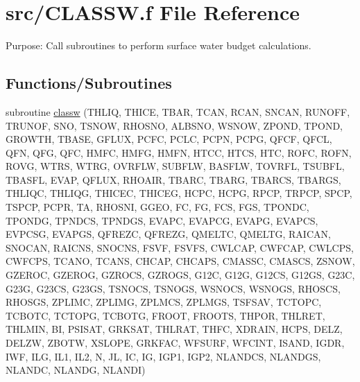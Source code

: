 \hypertarget{CLASSW_8f}{}\section{src/\+C\+L\+A\+S\+S\+W.f File Reference}
\label{CLASSW_8f}


Purpose\+: Call subroutines to perform surface water budget calculations.  


\subsection*{Functions/\+Subroutines}
\begin{DoxyCompactItemize}
\item 
subroutine \hyperlink{CLASSW_8f_aac1827011ed2ca61bd0274e83d1f80ad}{classw} (T\+H\+L\+I\+Q, T\+H\+I\+C\+E, T\+B\+A\+R, T\+C\+A\+N, R\+C\+A\+N, S\+N\+C\+A\+N, R\+U\+N\+O\+F\+F, T\+R\+U\+N\+O\+F, S\+N\+O, T\+S\+N\+O\+W, R\+H\+O\+S\+N\+O, A\+L\+B\+S\+N\+O, W\+S\+N\+O\+W, Z\+P\+O\+N\+D, T\+P\+O\+N\+D, G\+R\+O\+W\+T\+H, T\+B\+A\+S\+E, G\+F\+L\+U\+X, P\+C\+F\+C, P\+C\+L\+C, P\+C\+P\+N, P\+C\+P\+G, Q\+F\+C\+F, Q\+F\+C\+L, Q\+F\+N, Q\+F\+G, Q\+F\+C, H\+M\+F\+C, H\+M\+F\+G, H\+M\+F\+N, H\+T\+C\+C, H\+T\+C\+S, H\+T\+C, R\+O\+F\+C, R\+O\+F\+N, R\+O\+V\+G, W\+T\+R\+S, W\+T\+R\+G, O\+V\+R\+F\+L\+W, S\+U\+B\+F\+L\+W, B\+A\+S\+F\+L\+W, T\+O\+V\+R\+F\+L, T\+S\+U\+B\+F\+L, T\+B\+A\+S\+F\+L, E\+V\+A\+P, Q\+F\+L\+U\+X, R\+H\+O\+A\+I\+R, T\+B\+A\+R\+C, T\+B\+A\+R\+G, T\+B\+A\+R\+C\+S, T\+B\+A\+R\+G\+S, T\+H\+L\+I\+Q\+C, T\+H\+L\+I\+Q\+G, T\+H\+I\+C\+E\+C, T\+H\+I\+C\+E\+G, H\+C\+P\+C, H\+C\+P\+G, R\+P\+C\+P, T\+R\+P\+C\+P, S\+P\+C\+P, T\+S\+P\+C\+P, P\+C\+P\+R, T\+A, R\+H\+O\+S\+N\+I, G\+G\+E\+O, F\+C, F\+G, F\+C\+S, F\+G\+S, T\+P\+O\+N\+D\+C, T\+P\+O\+N\+D\+G, T\+P\+N\+D\+C\+S, T\+P\+N\+D\+G\+S, E\+V\+A\+P\+C, E\+V\+A\+P\+C\+G, E\+V\+A\+P\+G, E\+V\+A\+P\+C\+S, E\+V\+P\+C\+S\+G, E\+V\+A\+P\+G\+S, Q\+F\+R\+E\+Z\+C, Q\+F\+R\+E\+Z\+G, Q\+M\+E\+L\+T\+C, Q\+M\+E\+L\+T\+G, R\+A\+I\+C\+A\+N, S\+N\+O\+C\+A\+N, R\+A\+I\+C\+N\+S, S\+N\+O\+C\+N\+S, F\+S\+V\+F, F\+S\+V\+F\+S, C\+W\+L\+C\+A\+P, C\+W\+F\+C\+A\+P, C\+W\+L\+C\+P\+S, C\+W\+F\+C\+P\+S, T\+C\+A\+N\+O, T\+C\+A\+N\+S, C\+H\+C\+A\+P, C\+H\+C\+A\+P\+S, C\+M\+A\+S\+S\+C, C\+M\+A\+S\+C\+S, Z\+S\+N\+O\+W, G\+Z\+E\+R\+O\+C, G\+Z\+E\+R\+O\+G, G\+Z\+R\+O\+C\+S, G\+Z\+R\+O\+G\+S, G12\+C, G12\+G, G12\+C\+S, G12\+G\+S, G23\+C, G23\+G, G23\+C\+S, G23\+G\+S, T\+S\+N\+O\+C\+S, T\+S\+N\+O\+G\+S, W\+S\+N\+O\+C\+S, W\+S\+N\+O\+G\+S, R\+H\+O\+S\+C\+S, R\+H\+O\+S\+G\+S, Z\+P\+L\+I\+M\+C, Z\+P\+L\+I\+M\+G, Z\+P\+L\+M\+C\+S, Z\+P\+L\+M\+G\+S, T\+S\+F\+S\+A\+V, T\+C\+T\+O\+P\+C, T\+C\+B\+O\+T\+C, T\+C\+T\+O\+P\+G, T\+C\+B\+O\+T\+G, F\+R\+O\+O\+T, F\+R\+O\+O\+T\+S, T\+H\+P\+O\+R, T\+H\+L\+R\+E\+T, T\+H\+L\+M\+I\+N, B\+I, P\+S\+I\+S\+A\+T, G\+R\+K\+S\+A\+T, T\+H\+L\+R\+A\+T, T\+H\+F\+C, X\+D\+R\+A\+I\+N, H\+C\+P\+S, D\+E\+L\+Z, D\+E\+L\+Z\+W, Z\+B\+O\+T\+W, X\+S\+L\+O\+P\+E, G\+R\+K\+F\+A\+C, W\+F\+S\+U\+R\+F, W\+F\+C\+I\+N\+T, I\+S\+A\+N\+D, I\+G\+D\+R, I\+W\+F, I\+L\+G, I\+L1, I\+L2, N, J\+L, I\+C, I\+G, I\+G\+P1, I\+G\+P2, N\+L\+A\+N\+D\+C\+S, N\+L\+A\+N\+D\+G\+S, N\+L\+A\+N\+D\+C, N\+L\+A\+N\+D\+G, N\+L\+A\+N\+D\+I)
\end{DoxyCompactItemize}


